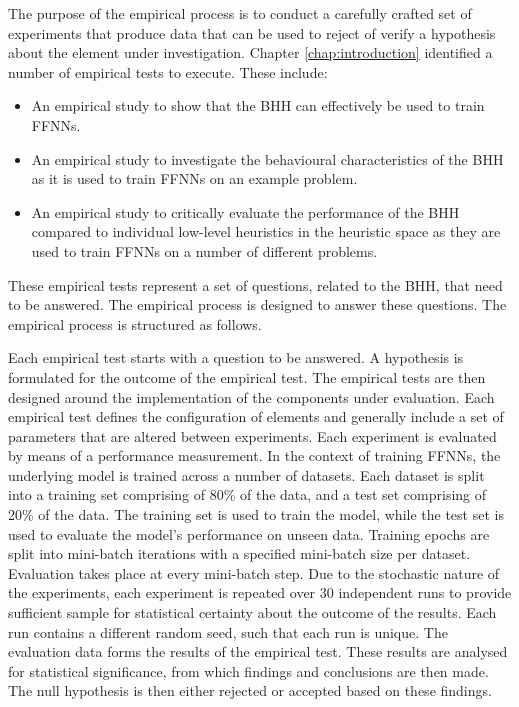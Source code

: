 The purpose of the empirical process is to conduct a carefully crafted set of experiments that produce data that can be used to reject of verify a hypothesis about the element under investigation. Chapter \ref{chap:introduction} identified a number of empirical tests to execute. These include:

\begin{itemize}
      \item An empirical study to show that the \Acs{BHH} can effectively be used to train \acp{FFNN}.

      \item An empirical study to investigate the behavioural characteristics of the \Acs{BHH} as it is used to train \acp{FFNN} on an example problem.

      \item An empirical study to critically evaluate the performance of the \Acs{BHH} compared to individual low-level heuristics in the heuristic space as they are used to train \acp{FFNN} on a number of different problems.
\end{itemize}

These empirical tests represent a set of questions, related to the \acs{BHH}, that need to be answered. The empirical process is designed to answer these questions. The empirical process is structured as follows.

Each empirical test starts with a question to be answered. A hypothesis is formulated for the outcome of the empirical test. The empirical tests are then designed around the implementation of the components under evaluation. Each empirical test defines the configuration of elements and generally include a set of parameters that are altered between experiments. Each experiment is evaluated by means of a performance measurement. In the context of training \acp{FFNN}, the underlying model is trained across a number of datasets. Each dataset is split into a training set comprising of 80\% of the data, and a test set comprising of 20\% of the data. The training set is used to train the model, while the test set is used to evaluate the model's performance on unseen data. Training epochs are split into mini-batch iterations with a specified mini-batch size per dataset. Evaluation takes place at every mini-batch step. Due to the stochastic nature of the experiments, each experiment is repeated over 30 independent runs to provide sufficient sample for statistical certainty about the outcome of the results. Each run contains a different random seed, such that each run is unique. The evaluation data forms the results of the empirical test. These results are analysed for statistical significance, from which findings and conclusions are then made. The null hypothesis is then either rejected or accepted based on these findings.


